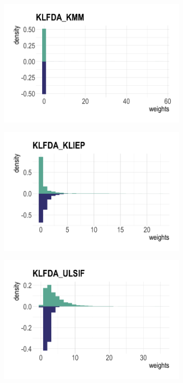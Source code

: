 \documentclass[a4paper,12pt]{article}
\begin{document}
\begin{figure}[H]
\begin{subfigure}{.32\textwidth}
  \label{fig:sfig1}
\end{subfigure}
\begin{subfigure}{.32\textwidth}
  \centering
  \includegraphics[width=\linewidth]{toy10.png}
  \label{fig:sfig2}
\end{subfigure} %
\begin{subfigure}{.32\textwidth}
  \centering
  \includegraphics[width=\linewidth]{toy11.png}
  \label{fig:sfig1}
\end{subfigure}%
\begin{subfigure}{.32\textwidth}
  \centering
  \includegraphics[width=\linewidth]{toy12.png}

\end{subfigure}
\end{figure}
\end{document}
